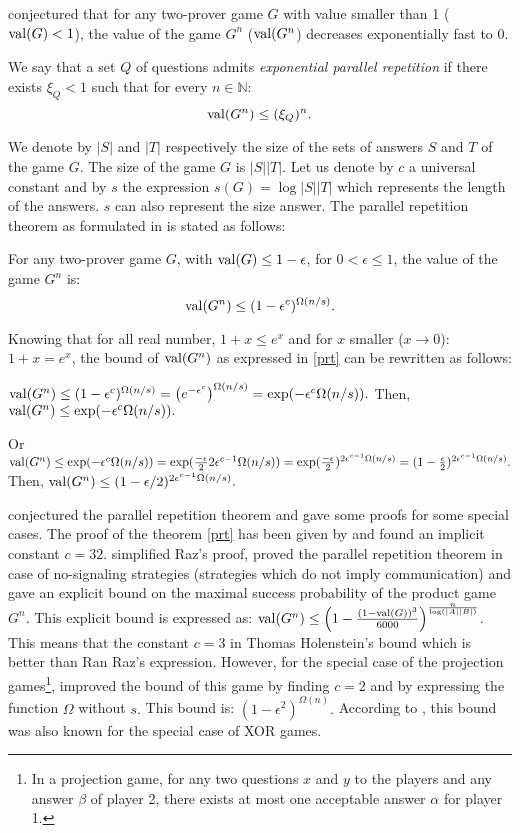 \cite{feige1992two} conjectured that  for any two-prover game $G$ with value smaller than 1 ($\mathrm{val} (G)<1$), the value of the game $G^n$ ($\mathrm{val} (G^n$) decreases exponentially fast to 0.

We say that a set $Q$ of questions admits
\textit{exponential parallel repetition} if there exists $\xi_Q < 1$ such that for every $n \in \mathbb{N}$: $$\mathrm{val} (G^n) \leq (\xi_Q)^n.$$

We denote by $|S|$ and $|T|$ respectively the size of the sets of answers $S$ and $T$ of the game $G$. The size of the game $G$ is $|S||T|$.  Let us denote by $c$ a universal constant and by $s$ the expression  $s(G)=\log |S||T|$ which represents the length of the answers. $s$ can also represent the size answer.
The parallel repetition theorem as formulated in \cite{raz1998parallel,raz2010parallel} is stated as follows:

\begin{thm} For any two-prover game $G$, with $\mathrm{val} (G) \leq 1-\epsilon$, for $0 < \epsilon \leq 1$, the value of the game $G^n$ is: $$ \mathrm{val} (G^n) \leq (1-\epsilon^c)^{\Omega(n/s)}.$$ \label{prt}    \end{thm}

Knowing that for all real number, $1+x \leq e^x$ and for $x$ smaller ($x\longrightarrow 0$): $1+x=e^x$, the bound of $\mathrm{val} (G^n)$ as expressed in \eqref{prt} can be rewritten as follows:

$\mathrm{val} (G^n) \leq (1-\epsilon^c)^{\Omega(n/s)} = \left(e^{-\epsilon^c}\right)^{\Omega(n/s)}= \exp (-\epsilon^c \Omega(n/s)).$ Then, $\mathrm{val} (G^n) \leq \exp (-\epsilon^c \Omega(n/s)).$

Or $\mathrm{val} (G^n) \leq \exp (-\epsilon^c \Omega(n/s))= \exp (\frac{-\epsilon}{2}2\epsilon^{c-1} \Omega(n/s))= \exp (\frac{-\epsilon}{2})^{2\epsilon^{c-1} \Omega(n/s)}= (1-\frac{\epsilon}{2})^{2\epsilon^{c-1} \Omega(n/s)}.$ Then, $\mathrm{val} (G^n) \leq (1-{\epsilon}/{2})^{2\epsilon^{c-1} \Omega(n/s)}.$

\cite{feige1992two} conjectured the parallel repetition theorem and gave some proofs for some special cases. The proof of the theorem \eqref{prt}  has been given by \cite{raz1998parallel} and found an implicit constant   $c=32$.  \cite{holenstein2007parallel} simplified Raz's proof, proved the parallel repetition theorem in case of no-signaling strategies (strategies which do
not imply communication) and gave an explicit bound on the maximal success probability of the product game $G^n.$ This explicit bound is expressed as:
$\mathrm{val} (G^n) \leq \left(1-\frac{(1-\mathrm{val} (G))^3}{6000} \right)^{\frac{n}{\log (|A||B|)}}$. This means that the constant $c=3$ in Thomas Holenstein's bound which is better than Ran Raz's expression. However, for the special case of the projection games\footnote{In a projection game, for any two questions $x$ and $y$ to the players and any answer $\beta$ of player 2, there exists at most one acceptable answer $\alpha$ for player 1.}, \cite{rao2011parallel} improved the bound of this game by finding $c=2$ and by expressing the function $\Omega$ without $s.$ This bound is: $(1-\epsilon^2)^{\Omega(n)}.$ According to \cite{raz2010parallel}, this bound was also known for the special case of XOR games.


